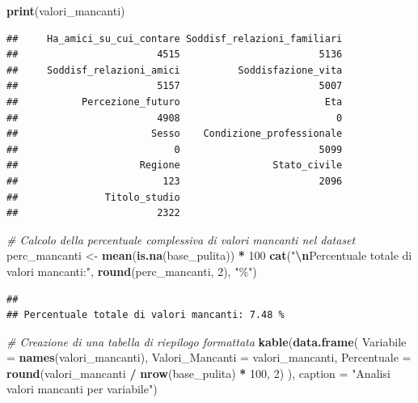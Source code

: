 \documentclass[
]{article}
\newenvironment{Shaded}{\begin{snugshade}}{\end{snugshade}}
\newcommand{\AttributeTok}[1]{\textcolor[rgb]{0.13,0.29,0.53}{#1}}
\newcommand{\CommentTok}[1]{\textcolor[rgb]{0.56,0.35,0.01}{\textit{#1}}}
\newcommand{\DecValTok}[1]{\textcolor[rgb]{0.00,0.00,0.81}{#1}}
\newcommand{\FunctionTok}[1]{\textcolor[rgb]{0.13,0.29,0.53}{\textbf{#1}}}
\newcommand{\NormalTok}[1]{#1}
\newcommand{\OtherTok}[1]{\textcolor[rgb]{0.56,0.35,0.01}{#1}}
\newcommand{\SpecialCharTok}[1]{\textcolor[rgb]{0.81,0.36,0.00}{\textbf{#1}}}
\newcommand{\StringTok}[1]{\textcolor[rgb]{0.31,0.60,0.02}{#1}}
\begin{document}
\begin{Shaded}
\begin{Highlighting}[]
\FunctionTok{print}\NormalTok{(valori\_mancanti)}
\end{Highlighting}
\end{Shaded}

\begin{verbatim}
##     Ha_amici_su_cui_contare Soddisf_relazioni_familiari 
##                        4515                        5136 
##     Soddisf_relazioni_amici          Soddisfazione_vita 
##                        5157                        5007 
##           Percezione_futuro                         Eta 
##                        4908                           0 
##                       Sesso    Condizione_professionale 
##                           0                        5099 
##                     Regione                Stato_civile 
##                         123                        2096 
##               Titolo_studio 
##                        2322
\end{verbatim}

\begin{Shaded}
\begin{Highlighting}[]
\CommentTok{\# Calcolo della percentuale complessiva di valori mancanti nel dataset}
\NormalTok{perc\_mancanti }\OtherTok{\textless{}{-}} \FunctionTok{mean}\NormalTok{(}\FunctionTok{is.na}\NormalTok{(base\_pulita)) }\SpecialCharTok{*} \DecValTok{100}
\FunctionTok{cat}\NormalTok{(}\StringTok{"}\SpecialCharTok{\textbackslash{}n}\StringTok{Percentuale totale di valori mancanti:"}\NormalTok{, }\FunctionTok{round}\NormalTok{(perc\_mancanti, }\DecValTok{2}\NormalTok{), }\StringTok{"\%"}\NormalTok{)}
\end{Highlighting}
\end{Shaded}

\begin{verbatim}
## 
## Percentuale totale di valori mancanti: 7.48 %
\end{verbatim}

\begin{Shaded}
\begin{Highlighting}[]
\CommentTok{\# Creazione di una tabella di riepilogo formattata}
\FunctionTok{kable}\NormalTok{(}\FunctionTok{data.frame}\NormalTok{(}
  \AttributeTok{Variabile =} \FunctionTok{names}\NormalTok{(valori\_mancanti),}
  \AttributeTok{Valori\_Mancanti =}\NormalTok{ valori\_mancanti,}
  \AttributeTok{Percentuale =} \FunctionTok{round}\NormalTok{(valori\_mancanti }\SpecialCharTok{/} \FunctionTok{nrow}\NormalTok{(base\_pulita) }\SpecialCharTok{*} \DecValTok{100}\NormalTok{, }\DecValTok{2}\NormalTok{)}
\NormalTok{), }\AttributeTok{caption =} \StringTok{"Analisi valori mancanti per variabile"}\NormalTok{)}
\end{Highlighting}
\end{Shaded}
\end{document}
